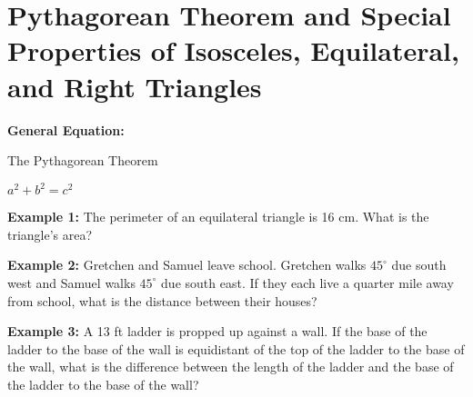 \section[Special Triangles]{Pythagorean Theorem and Special Properties of Isosceles, Equilateral, and Right Triangles}

\textbf{General Equation:}

\begin{center}
The Pythagorean Theorem

$a^2+b^2=c^2$
\end{center}

\vfill\textbf{Example 1:} The perimeter of an equilateral triangle is 16 cm. What is the triangle's area?

\vfill\textbf{Example 2:} Gretchen and Samuel leave school. Gretchen walks $45^\circ$ due south west and Samuel walks $45^\circ$ due south east. If they each live a quarter mile away from school, what is the distance between their houses?

\vfill\textbf{Example 3:} A 13 ft ladder is propped up against a wall. If the base of the ladder to the base of the wall is equidistant of the top of the ladder to the base of the wall, what is the difference between the length of the ladder and the base of the ladder to the base of the wall?

